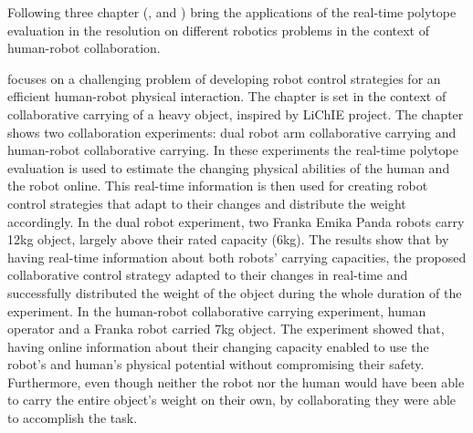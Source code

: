 Following three chapter (,  and ) bring the applications of the real-time polytope evaluation in the resolution on different robotics problems in the context of human-robot collaboration.


 focuses on a challenging problem of developing robot control strategies for an efficient human-robot physical interaction. The chapter is set in the context of collaborative carrying of a heavy object, inspired by LiChIE project. 
The chapter shows two collaboration experiments: dual robot arm collaborative carrying and human-robot collaborative carrying. In these experiments the real-time polytope evaluation is used to estimate the changing physical abilities of the human and the robot online. This real-time information is then used for creating robot control strategies that adapt to their changes and distribute the weight accordingly. In the dual robot experiment, two Franka Emika Panda robots carry 12kg object, largely above their rated capacity (6kg). The results show that by having real-time information about both robots' carrying capacities, the proposed collaborative control strategy adapted to their changes in real-time and successfully distributed the weight of the object during the whole duration of the experiment. In the human-robot collaborative carrying experiment, human operator and a Franka robot carried 7kg object. The experiment showed that, having online information about their changing capacity enabled to use the robot's and human's physical potential without compromising their safety. Furthermore, even though neither the robot nor the human would have been able to carry the entire object's weight on their own, by collaborating they were able to accomplish the task.
 

